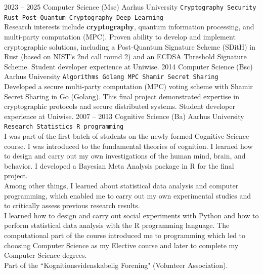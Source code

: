 \documentclass[9pt]{developercv} %
\begin{document}
\begin{entrylist}
	\entry
		{2023 -- 2025}
		{Computer Science (Msc)}
		{Aarhus University}
		{
			\texttt{Cryptography \slashsep Security \slashsep Rust \slashsep Post-Quantum Cryptography \slashsep Deep Learning}\\

			Research interests include \textbf{cryptography}, quantum information processing, and multi-party computation (MPC). Proven ability to develop and implement cryptographic solutions, including a Post-Quantum Signature Scheme (SDitH) in Rust (based on NIST's 2nd call round 2) and an ECDSA Threshold Signature Scheme. Student developer experience at Uniwise.
		}
	\entry
		{2014}
		{Computer Science (Bsc)}
		{Aarhus University}
		{
			\texttt{Algorithms \slashsep Golang \slashsep MPC \slashsep Shamir Secret Sharing}\\

			Developed a secure multi-party computation (MPC) voting scheme with Shamir Secret Sharing in Go (Golang). This final project demonstrated expertise in cryptographic protocols and secure distributed systems. Student developer experience at Uniwise.
		}
	\entry
		{2007 -- 2013}
		{Cognitive Science (Ba)}
		{Aarhus University}
		{
			\texttt{Research \slashsep Statistics \slashsep R programming}\\

			I was part of the first batch of students on the newly formed Cognitive Science course. I was introduced to the fundamental theories of cognition. I learned how to design and carry out my own investigations of the human mind, brain, and behavior. I developed a Bayesian Meta Analysis package in R for the final project.\\

			Among other things, I learned about statistical data analysis and computer programming, which enabled me to carry out my own experimental studies and to critically assess previous research results.\\

			I learned how to design and carry out social experiments with Python and how to perform statistical data analysis with the R programming language. The computational part of the course introduced me to programming which led to choosing Computer Science as my Elective course and later to complete my Computer Science degrees.\\

			Part of the “Kognitionsvidenskabelig Forening" (Volunteer Association).
		}
\end{entrylist}
\end{document}
